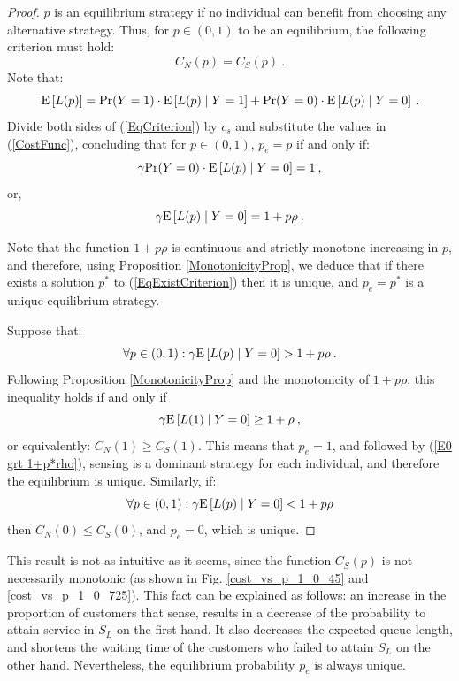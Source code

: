 \documentclass[11pt]{article}
\numberwithin{equation}{section}
\newcommand{\pr}{{\rm Pr}}
\newcommand{\e}{{\rm E}}
\begin{document}
\begin{proof}

$p$ is an equilibrium strategy if no individual can benefit from choosing any alternative strategy. Thus, for $p \in (0,1)$ to be an equilibrium, the following criterion must hold: 
\begin{equation}
C_{N}(p)=C_{S}(p)\:. \label{EqCriterion}
\end{equation}
Note that:
\[ \e\left[L(p)\right] = \pr(Y=1) \cdot \e\left[L(p)\mid Y=1\right] + \pr(Y=0) \cdot \e\left[L(p)\mid Y=0\right] \:. \]
Divide both sides of (\ref{EqCriterion}) by $c_{s}$ and substitute the values in (\ref{CostFunc}), concluding that for $p \in (0,1)$, $p_{e} = p$ if and only if:
\begin{equation}
\gamma \pr(Y=0) \cdot \e\left[L(p)\mid Y=0\right] = 1\:,
\label{gamma p0 e0 = 1}
\end{equation}
or,
\begin{equation}
\gamma \e\left[L(p)\mid Y=0\right]=1+p\rho\:. \label{EqExistCriterion}
\end{equation}

Note that the function $1+p\rho$ is continuous and strictly monotone increasing in $p$, and therefore, using Proposition \ref{MonotonicityProp}, we deduce that if there exists a solution $p^*$ to (\ref{EqExistCriterion}) then it is unique, and $p_e = p^*$ is a unique equilibrium strategy. 

Suppose that:
\begin{equation}
\forall p \in (0,1): \gamma \e\left[L(p)\mid Y=0\right] > 1+p\rho \:. \label{E0 grt 1+p*rho}
\end{equation}
Following Proposition \ref{MonotonicityProp} and the monotonicity of $1+p\rho$, this inequality holds if and only if \[ \gamma \e\left[L(1)\mid Y=0\right] \geq 1+\rho \:,\] or equivalently: $C_{N}(1) \geq C_{S}(1)$. This means that $p_{e}=1$, and followed by (\ref{E0 grt 1+p*rho}), sensing is a dominant strategy for each individual, and therefore the equilibrium is unique. Similarly, if: 
\[ \forall p \in (0,1): \gamma \e\left[L(p)\mid Y=0\right] < 1+p\rho \] 
then $C_{N}(0) \leq C_{S}(0)$, and $p_{e}=0$, which is unique.
\end{proof}

This result is not as intuitive as it seems, since the function $C_{S}(p)$ is not necessarily monotonic (as shown in Fig. \ref{cost_vs_p_1_0_45} and \ref{cost_vs_p_1_0_725}). This fact can be explained as follows: an increase in the proportion of customers that sense, results in a decrease of the probability to attain service in $S_L$ on the first hand. It also decreases the expected queue length, and shortens the waiting time of the customers who failed to attain $S_L$ on the other hand. Nevertheless, the equilibrium probability $p_{e}$ is always unique.
\end{document}

